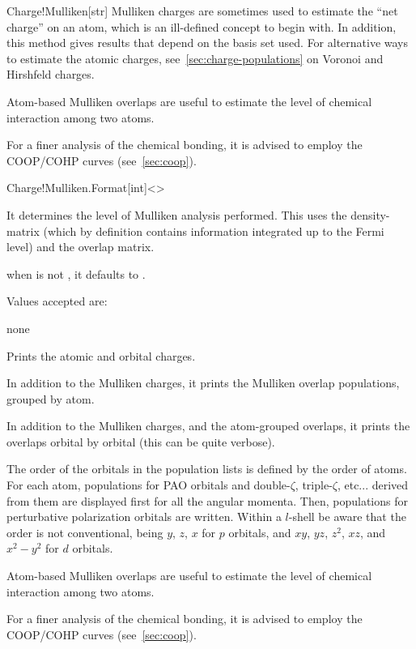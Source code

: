 \begin{fdfentry}{Charge!Mulliken}[str]
  Mulliken charges are sometimes used to estimate the ``net charge''
  on an atom, which is an ill-defined concept to begin with. In
  addition, this method gives results that depend on the basis set
  used. For alternative ways to estimate the atomic charges,
  see~\ref{sec:charge-populations} on Voronoi and Hirshfeld charges.
  
  Atom-based Mulliken overlaps are useful to estimate the level of chemical
  interaction among two atoms.
  
  For a finer analysis of the chemical bonding, it is advised to
  employ the COOP/COHP curves (see~\ref{sec:coop}).
  
\end{fdfentry}

\begin{fdfentry}{Charge!Mulliken.Format}[int]<>

  It determines the level of Mulliken analysis performed. This
  uses the density-matrix (which by definition contains information
  integrated up to the Fermi level) and the overlap matrix.

  \note when  is not , it defaults to .

  Values accepted are:
  \begin{fdfoptions}
    \option[0]%
    none

    \option[1]%
    Prints the atomic and orbital charges.

    \option[2]%
    In addition to the Mulliken charges, it prints the Mulliken overlap
    populations, grouped by atom.

    \option[3]%
    In addition to the Mulliken charges, and the atom-grouped overlaps,
    it prints the overlaps orbital by orbital (this can be quite verbose).

  \end{fdfoptions}

  The order of the orbitals in the population lists is defined by the
  order of atoms. For each atom, populations for PAO orbitals and
  double-$\zeta$, triple-$\zeta$, etc... derived from them are displayed first
  for all the angular momenta. Then, populations for perturbative
  polarization orbitals are written.  Within a $l$-shell be aware that
  the order is not conventional, being $y$, $z$, $x$ for $p$ orbitals,
  and $xy$, $yz$, $z^2$, $xz$, and $x^2-y^2$ for $d$ orbitals.

  Atom-based Mulliken overlaps are useful to estimate the level of chemical
  interaction among two atoms.

  For a finer analysis of the chemical bonding, it is advised to
  employ the COOP/COHP curves (see~\ref{sec:coop}).
  
\end{fdfentry}




